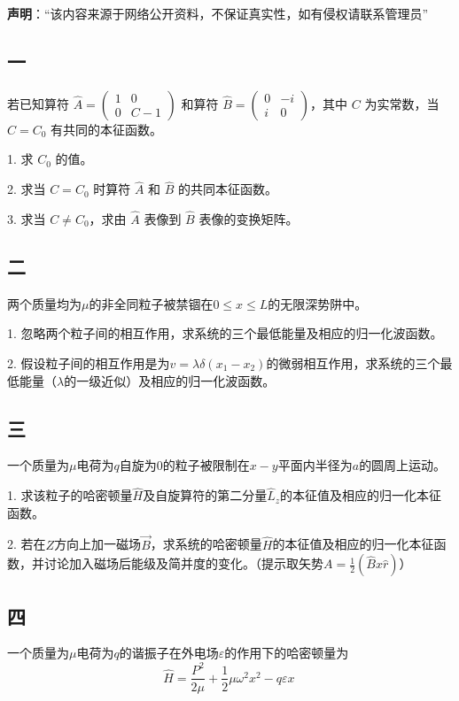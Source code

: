 
\textbf{声明}：“该内容来源于网络公开资料，不保证真实性，如有侵权请联系管理员”

\subsection{一}
若已知算符 $\hat{A} = \begin{pmatrix}
1 & 0 \\
0 & C - 1
\end{pmatrix}$ 和算符 $\hat{B} = \begin{pmatrix}
0 & -i \\
i & 0
\end{pmatrix}$，其中 $C$ 为实常数，当 $C = C_0$ 有共同的本征函数。

1. 求 $C_0$ 的值。

2. 求当 $C = C_0$ 时算符 $\hat{A}$ 和 $\hat{B}$ 的共同本征函数。

3. 求当 $C \neq C_0$，求由 $\hat{A}$ 表像到 $\hat{B}$ 表像的变换矩阵。

\subsection{二}
两个质量均为$\mu$的非全同粒子被禁锢在$0 \le x \le L$的无限深势阱中。

1. 忽略两个粒子间的相互作用，求系统的三个最低能量及相应的归一化波函数。

2. 假设粒子间的相互作用是为$v = \lambda \delta (x_1 - x_2)$的微弱相互作用，求系统的三个最低能量（$\lambda$的一级近似）及相应的归一化波函数。

\subsection{三}
一个质量为$\mu$电荷为$q$自旋为$0$的粒子被限制在$x-y$平面内半径为$a$的圆周上运动。

1. 求该粒子的哈密顿量$\hat H$及自旋算符的第二分量$\hat{L}_z$的本征值及相应的归一化本征函数。

2. 若在$Z$方向上加一磁场$\vec{B}$，求系统的哈密顿量$\hat{H}$的本征值及相应的归一化本征函数，并讨论加入磁场后能级及简并度的变化。（提示取矢势$A=\frac{1}{2}(\hat{B} x\hat{r})$）

\subsection{四}
一个质量为$\mu$电荷为$q$的谐振子在外电场$\varepsilon$的作用下的哈密顿量为
$$\hat{H} = \frac{P^2}{2\mu} + \frac{1}{2}\mu \omega^2 x^2 - q \varepsilon x~$$

